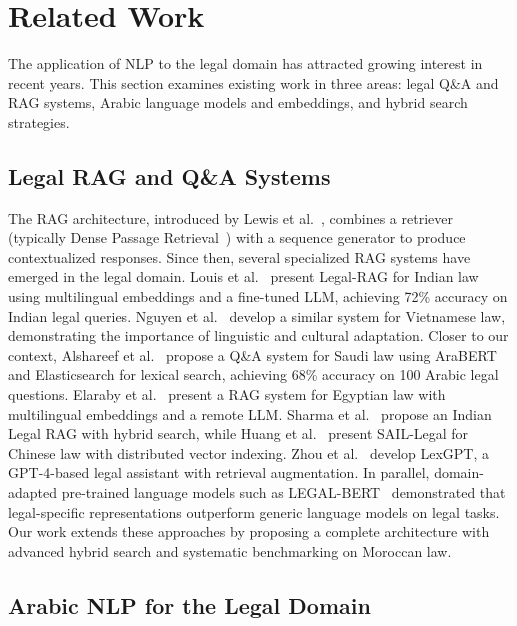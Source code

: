 \section{Related Work}
\label{sec:related}

The application of NLP to the legal domain has attracted growing interest in
recent years. This section examines existing work in three areas: legal Q\&A
and RAG systems, Arabic language models and embeddings, and hybrid search
strategies.

\subsection{Legal RAG and Q\&A Systems}

The RAG architecture, introduced by Lewis et al.~\cite{lewis2020retrieval},
combines a retriever (typically Dense Passage
Retrieval~\cite{karpukhin2020dense}) with a sequence generator to produce
contextualized responses. Since then, several
specialized RAG systems have emerged in the legal domain.
Louis et al.~\cite{louis2023legal} present Legal-RAG for Indian law using
multilingual embeddings and a fine-tuned LLM, achieving 72\% accuracy on
Indian legal queries. Nguyen et al.~\cite{nguyen2023vietnamese} develop a
similar system for Vietnamese law, demonstrating the importance of linguistic
and cultural adaptation. Closer to our context,
Alshareef et al.~\cite{alshareef2023arabic} propose a Q\&A system for Saudi
law using AraBERT and Elasticsearch for lexical search, achieving 68\%
accuracy on 100 Arabic legal questions. Elaraby et al.~\cite{elaraby2024legal}
present a RAG system for Egyptian law with multilingual embeddings and a
remote LLM. Sharma et al.~\cite{sharma2024indian} propose an Indian Legal RAG
with hybrid search, while Huang et al.~\cite{huang2024sail} present
SAIL-Legal for Chinese law with distributed vector indexing.
Zhou et al.~\cite{zhou2023lexgpt} develop LexGPT, a GPT-4-based legal
assistant with retrieval augmentation. In parallel, domain-adapted pre-trained
language models such as LEGAL-BERT~\cite{chalkidis2020legal} demonstrated
that legal-specific representations outperform generic language models on
legal tasks. Our work extends these approaches by proposing a complete
architecture with advanced hybrid search and systematic benchmarking on
Moroccan law.

\subsection{Arabic NLP for the Legal Domain}

